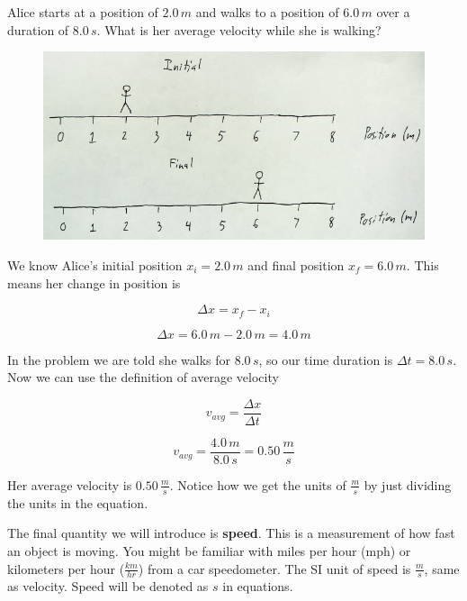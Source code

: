 \documentclass[12pt]{book}
\begin{document}
\begin{exampleblock}

Alice starts at a position of $2.0 \, m$ and walks to a position of $6.0 \, m$ over a duration of $8.0 \, s$. What is her average velocity while she is walking?

\begin{figure}[h]
\centering
\includegraphics[scale=0.8]{example_units_velocity_walking.png}
\end{figure}

We know Alice's initial position $x_i = 2.0 \, m$ and final position $x_f = 6.0 \, m$. This means her change in position is

\begin{equation}
\Delta x = x_f - x_i
\end{equation}

\begin{equation}
\Delta x = 6.0 \, m - 2.0 \, m = 4.0 \, m
\end{equation}

In the problem we are told she walks for $8.0 \, s$, so our time duration is $\Delta t = 8.0 \, s$. Now we can use the definition of average velocity

\begin{equation}
v_{avg} = \frac{\Delta x}{\Delta t}
\end{equation}

\begin{equation}
v_{avg} = \frac{4.0 \, m}{8.0 \, s} = 0.50 \, \frac{m}{s}
\end{equation}

Her average velocity is $0.50 \, \frac{m}{s}$. Notice how we get the units of $\frac{m}{s}$ by just dividing the units in the equation.

\end{exampleblock}

The final quantity we will introduce is \textbf{speed}. This is a measurement of how fast an object is moving. You might be familiar with miles per hour (mph) or kilometers per hour ($\frac{km}{hr}$) from a car speedometer. The SI unit of speed is $\frac{m}{s}$, same as velocity. Speed will be denoted as $s$ in equations.
\end{document}
